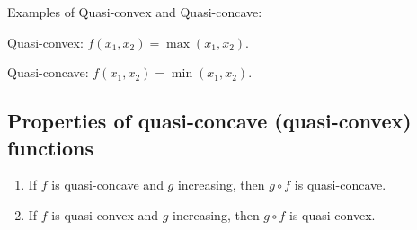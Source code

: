 \begin{remark*}Examples of Quasi-convex and Quasi-concave:

    Quasi-convex: $f(x_1,x_2) = \max(x_1, x_2)$.

    Quasi-concave: $f(x_1,x_2) = \min(x_1, x_2)$.
\end{remark*}

\subsection{Properties of quasi-concave (quasi-convex) functions}

\begin{enumerate}
    \item
          If \(f\) is quasi-concave and \(g\) increasing, then \(g \circ f\) is
          quasi-concave.
    \item
          If \(f\) is quasi-convex and \(g\) increasing, then \(g \circ f\) is
          quasi-convex.
\end{enumerate}

